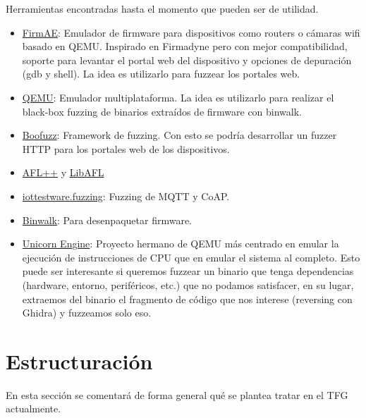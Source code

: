 \documentclass[11pt, a4paper, openany]{report}
\begin{document}
    Herramientas encontradas hasta el momento que pueden ser de utilidad.
    \begin{itemize}
        \item \href{https://github.com/pr0v3rbs/FirmAE}{FirmAE}: Emulador de firmware para dispositivos
        como routers o cámaras wifi basado en QEMU. Inspirado en Firmadyne pero con mejor compatibilidad, soporte
        para levantar el portal web del dispositivo y opciones de depuración (gdb y shell). La idea es
        utilizarlo para fuzzear los portales web.
        \item \href{https://www.qemu.org/}{QEMU}: Emulador multiplataforma. La idea es utilizarlo para 
        realizar el black-box fuzzing de binarios extraídos de firmware con binwalk.
        \item \href{https://github.com/jtpereyda/boofuzz}{Boofuzz}: Framework de fuzzing. Con esto se podría
        desarrollar un fuzzer HTTP para los portales web de los dispositivos.
        \item \href{https://github.com/AFLplusplus/AFLplusplus}{AFL++} y \href{https://github.com/AFLplusplus/LibAFL}{LibAFL}
        \item \href{https://github.com/eclipse/iottestware.fuzzing}{iottestware.fuzzing}: Fuzzing de MQTT y CoAP.
        \item \href{https://github.com/ReFirmLabs/binwalk}{Binwalk}: Para desenpaquetar firmware.
        \item \href{https://github.com/unicorn-engine/unicorn}{Unicorn Engine}: Proyecto hermano de QEMU más centrado en
        emular la ejecución de instrucciones de CPU que en emular el sistema al completo. Esto puede ser interesante si
        queremos fuzzear un binario que tenga dependencias (hardware, entorno, periféricos, etc.) que no podamos
        satisfacer, en su lugar, extraemos del binario el fragmento de código que nos interese (reversing con Ghidra) y
        fuzzeamos solo eso. 
    \end{itemize}

    \section{Estructuración}
    En esta sección se comentará de forma general qué se plantea tratar en el TFG actualmente.
    
\end{document}
